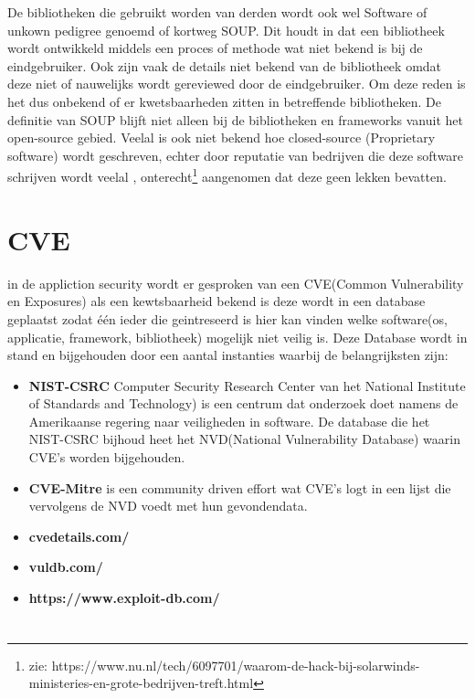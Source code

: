 De bibliotheken die gebruikt worden van derden wordt ook wel Software of unkown pedigree genoemd of kortweg SOUP. Dit houdt in dat een bibliotheek wordt ontwikkeld middels een proces of methode wat niet bekend is bij de eindgebruiker. Ook zijn vaak de details niet bekend van de bibliotheek omdat deze niet of nauwelijks wordt gereviewed door de eindgebruiker. Om deze reden is het dus onbekend of er kwetsbaarheden zitten in betreffende bibliotheken.
De definitie van SOUP blijft niet alleen bij de bibliotheken en frameworks vanuit het open-source gebied. Veelal is ook niet bekend hoe closed-source (Proprietary software) wordt geschreven, echter door reputatie van bedrijven die deze software schrijven wordt veelal , onterecht\footnote{zie: https://www.nu.nl/tech/6097701/waarom-de-hack-bij-solarwinds-ministeries-en-grote-bedrijven-treft.html } aangenomen dat deze geen lekken bevatten.

\section{CVE}
in de appliction security wordt er gesproken van een CVE(Common Vulnerability en Exposures) als een kewtsbaarheid bekend is deze wordt in een database geplaatst zodat \'e\'en ieder die geintreseerd is hier kan vinden welke software(os, applicatie, framework, bibliotheek) mogelijk niet veilig is. Deze Database wordt in stand en bijgehouden door een aantal instanties waarbij de belangrijksten zijn:
\begin{itemize}
  \item \textbf{NIST-CSRC} Computer Security Research Center van het National Institute of Standards and Technology) is een centrum dat onderzoek doet namens de Amerikaanse regering naar veiligheden in software. De database die het NIST-CSRC bijhoud heet het NVD(National Vulnerability Database) waarin CVE's worden bijgehouden.
  \item \textbf{CVE-Mitre} is een community driven effort wat CVE's logt in een lijst die vervolgens de NVD voedt met hun gevondendata.
  \item \textbf{cvedetails.com/}
  \item \textbf{vuldb.com/}
  \item \textbf{https://www.exploit-db.com/}
\end{itemize}

\section{}

